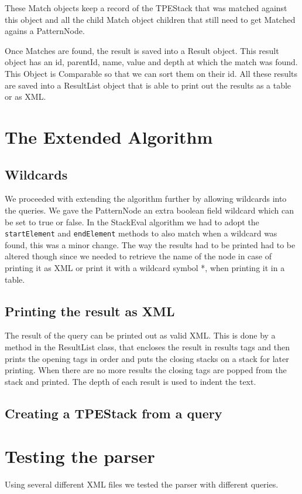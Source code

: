 \documentclass[11pt]{article}
\begin{document}
These Match objects keep a record of the TPEStack that was matched against this object and all the child Match object children that still need to get Matched agains a PatternNode. 

Once Matches are found, the result is saved into a Result object. This result object has an id, parentId, name, value and depth at which the match was found. This Object is Comparable so that we can sort them on their id. All these results are saved into a ResultList object that is able to print out the results as a table or as XML. 



\newpage
\section{The Extended Algorithm}
\subsection{Wildcards}
We proceeded with extending the algorithm further by allowing wildcards into the queries. We gave the PatternNode an extra boolean field wildcard which can be set to true or false. In the StackEval algorithm we had to adopt the \lstinline{startElement} and \lstinline{endElement} methods to also match when a wildcard was found, this was a minor change. The way the results had to be printed had to be altered though since we needed to retrieve the name of the node in case of printing it as XML or print it with a wildcard symbol *, when printing it in a table.

\subsection{Printing the result as XML}
The result of the query can be printed out as valid XML. This is done by a method in the ResultList class, that encloses the result in results tags and then prints the opening tags in order and puts the closing stacks on a stack for later printing. When there are no more results the closing tags are popped from the stack and printed. The depth of each result is used to indent the text.

\subsection{Creating a TPEStack from a query}

\newpage
\section{Testing the parser}
Using several different XML files we tested the parser with different queries.
\end{document}
